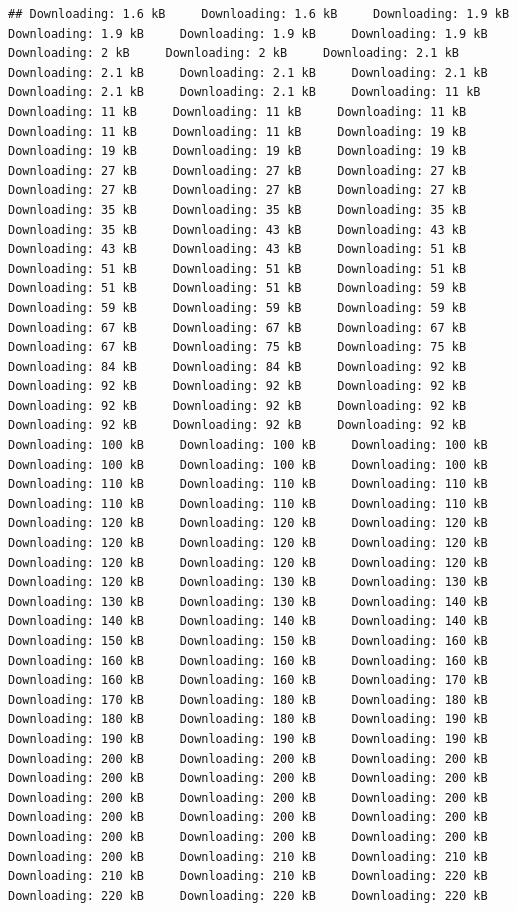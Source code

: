 \documentclass[
]{book}
\begin{document}
\begin{verbatim}
## Downloading: 1.6 kB     Downloading: 1.6 kB     Downloading: 1.9 kB     Downloading: 1.9 kB     Downloading: 1.9 kB     Downloading: 1.9 kB     Downloading: 2 kB     Downloading: 2 kB     Downloading: 2.1 kB     Downloading: 2.1 kB     Downloading: 2.1 kB     Downloading: 2.1 kB     Downloading: 2.1 kB     Downloading: 2.1 kB     Downloading: 11 kB     Downloading: 11 kB     Downloading: 11 kB     Downloading: 11 kB     Downloading: 11 kB     Downloading: 11 kB     Downloading: 19 kB     Downloading: 19 kB     Downloading: 19 kB     Downloading: 19 kB     Downloading: 27 kB     Downloading: 27 kB     Downloading: 27 kB     Downloading: 27 kB     Downloading: 27 kB     Downloading: 27 kB     Downloading: 35 kB     Downloading: 35 kB     Downloading: 35 kB     Downloading: 35 kB     Downloading: 43 kB     Downloading: 43 kB     Downloading: 43 kB     Downloading: 43 kB     Downloading: 51 kB     Downloading: 51 kB     Downloading: 51 kB     Downloading: 51 kB     Downloading: 51 kB     Downloading: 51 kB     Downloading: 59 kB     Downloading: 59 kB     Downloading: 59 kB     Downloading: 59 kB     Downloading: 67 kB     Downloading: 67 kB     Downloading: 67 kB     Downloading: 67 kB     Downloading: 75 kB     Downloading: 75 kB     Downloading: 84 kB     Downloading: 84 kB     Downloading: 92 kB     Downloading: 92 kB     Downloading: 92 kB     Downloading: 92 kB     Downloading: 92 kB     Downloading: 92 kB     Downloading: 92 kB     Downloading: 92 kB     Downloading: 92 kB     Downloading: 92 kB     Downloading: 100 kB     Downloading: 100 kB     Downloading: 100 kB     Downloading: 100 kB     Downloading: 100 kB     Downloading: 100 kB     Downloading: 110 kB     Downloading: 110 kB     Downloading: 110 kB     Downloading: 110 kB     Downloading: 110 kB     Downloading: 110 kB     Downloading: 120 kB     Downloading: 120 kB     Downloading: 120 kB     Downloading: 120 kB     Downloading: 120 kB     Downloading: 120 kB     Downloading: 120 kB     Downloading: 120 kB     Downloading: 120 kB     Downloading: 120 kB     Downloading: 130 kB     Downloading: 130 kB     Downloading: 130 kB     Downloading: 130 kB     Downloading: 140 kB     Downloading: 140 kB     Downloading: 140 kB     Downloading: 140 kB     Downloading: 150 kB     Downloading: 150 kB     Downloading: 160 kB     Downloading: 160 kB     Downloading: 160 kB     Downloading: 160 kB     Downloading: 160 kB     Downloading: 160 kB     Downloading: 170 kB     Downloading: 170 kB     Downloading: 180 kB     Downloading: 180 kB     Downloading: 180 kB     Downloading: 180 kB     Downloading: 190 kB     Downloading: 190 kB     Downloading: 190 kB     Downloading: 190 kB     Downloading: 200 kB     Downloading: 200 kB     Downloading: 200 kB     Downloading: 200 kB     Downloading: 200 kB     Downloading: 200 kB     Downloading: 200 kB     Downloading: 200 kB     Downloading: 200 kB     Downloading: 200 kB     Downloading: 200 kB     Downloading: 200 kB     Downloading: 200 kB     Downloading: 200 kB     Downloading: 200 kB     Downloading: 200 kB     Downloading: 210 kB     Downloading: 210 kB     Downloading: 210 kB     Downloading: 210 kB     Downloading: 220 kB     Downloading: 220 kB     Downloading: 220 kB     Downloading: 220 kB 
\end{verbatim}
\end{document}
